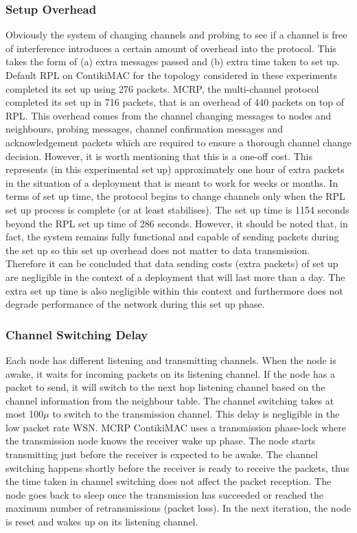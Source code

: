 \subsubsection{Setup Overhead}
Obviously the system of changing channels and probing to see if a channel is free of interference introduces a certain amount of overhead into
the protocol. This takes the form of (a) extra messages passed and (b) extra time taken to set up. Default RPL on ContikiMAC for the topology considered in these experiments completed its set up using 276 packets. MCRP, the multi-channel protocol completed its set up in 716 packets, that is an overhead of 440 packets on top of RPL. 
This overhead comes from the channel changing messages to nodes and neighbours, probing messages, channel confirmation messages and acknowledgement packets which are required to ensure a thorough channel change decision.
However, it is worth mentioning that this is a one-off cost. This represents (in this experimental set up) approximately one hour of extra packets in the situation of a deployment that is meant to work for weeks or months.  In terms of set up time, the protocol begins to change channels only when the RPL set up process is complete (or at least stabilises). The set up time is 1154 seconds beyond the RPL set up time of 286 seconds. However, it should be noted that, in fact, the system remains fully functional and capable of sending packets during the set up so this set up overhead does not matter to data transmission.
Therefore it can be concluded that data sending costs (extra packets) of set up are negligible in the context of a deployment that will last more than a day. The extra set up time is also negligible within this context and furthermore does not degrade performance of the network during this set up phase.

\subsubsection{Channel Switching Delay}
Each node has different listening and transmitting channels. When the node is awake, it waits for incoming packets on its listening channel. If the node has a packet to send, it will switch to the next hop listening channel based on the channel information from the neighbour table. The channel switching takes at most 100$\mu$ to switch to the transmission channel. This delay is negligible in the low packet rate WSN. MCRP ContikiMAC uses a transmission phase-lock where the transmission node knows the receiver wake up phase. The node starts transmitting just before the receiver is expected to be awake. The channel switching happens shortly before the receiver is ready to receive the packets, thus the time taken in channel switching does not affect the packet reception.
The node goes back to sleep once the transmission has succeeded or reached the maximum number of retransmissions (packet loss). In the next iteration, the node is reset and wakes up on its listening channel. 


